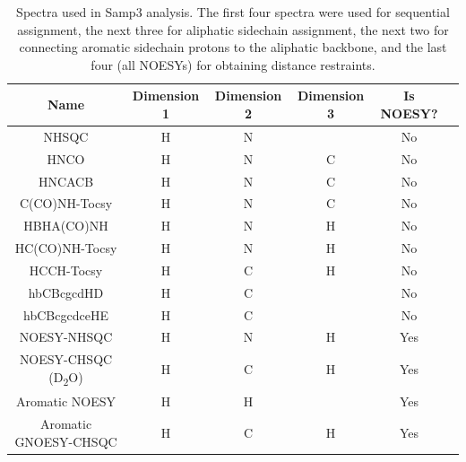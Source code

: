 \begin{table}[h]
    \begin{tabular}{ | c || c | c | c | c | c |}
    \hline
      Name              &  Dimension 1  &  Dimension 2  &  Dimension 3  &  Is NOESY?    \\    \hline
      NHSQC             &  H            &  N            &               &  No           \\    \hline
      HNCO              &  H            &  N            &  C            &  No           \\    \hline
      HNCACB            &  H            &  N            &  C            &  No           \\    \hline
      C(CO)NH-Tocsy     &  H            &  N            &  C            &  No           \\    \hline
      HBHA(CO)NH        &  H            &  N            &  H            &  No           \\    \hline
      HC(CO)NH-Tocsy    &  H            &  N            &  H            &  No           \\    \hline
      HCCH-Tocsy        &  H            &  C            &  H            &  No           \\    \hline
      hbCBcgcdHD        &  H            &  C            &               &  No           \\    \hline
      hbCBcgcdceHE      &  H            &  C            &               &  No           \\    \hline
      NOESY-NHSQC       &  H            &  N            &  H            &  Yes          \\    \hline
NOESY-CHSQC (D\textsubscript{2}O) & H   &  C            &  H            &  Yes          \\    \hline
      Aromatic NOESY    &  H            &  H            &               &  Yes          \\    \hline
 Aromatic GNOESY-CHSQC  &  H            &  C            &  H            &  Yes          \\    \hline
    \end{tabular}
    \caption[Spectra used in Samp3 analysis.]
            {Spectra used in Samp3 analysis.  The first four spectra were used
             for sequential assignment, the next three for aliphatic sidechain
             assignment, the next two for connecting aromatic sidechain protons
             to the aliphatic backbone, and the last four (all NOESYs) for
             obtaining distance restraints.}
    \label{samp3_spectra}
\end{table}


